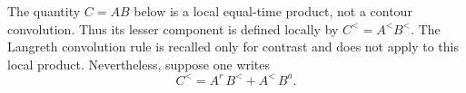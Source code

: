 \documentclass{article}
\begin{document}
The quantity $C=AB$ below is a local equal-time product, not a contour
convolution.  Thus its lesser component is defined locally by
$C^{<}=A^{<}B^{<}$.  The Langreth convolution rule is recalled only for
contrast and does not apply to this local product.  Nevertheless, suppose
one writes
\begin{equation}
C^{<}=A^{r}\,B^{<}+A^{<}\,B^{a}.\label{local-lesser}
\end{equation}
\end{document}
